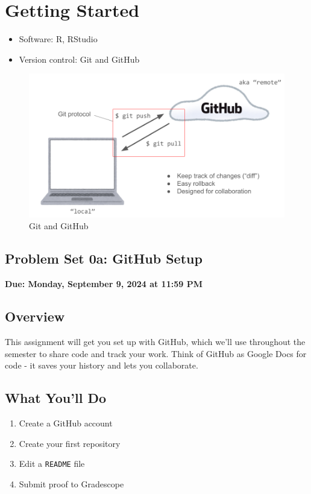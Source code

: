 \documentclass[
  11pt,
  letterpaper]{article}
\providecommand{\tightlist}{%
  \setlength{\itemsep}{0pt}\setlength{\parskip}{0pt}}
\begin{document}
\section{Getting Started}\label{getting-started}

\begin{itemize}
\item
  Software: R, RStudio
\item
  Version control: Git and GitHub
\end{itemize}

\begin{figure}
\centering
\includegraphics[width=0.75\linewidth,height=\textheight,keepaspectratio]{assets/gitvsgithub.png}
\caption{Git and GitHub}
\end{figure}

\newpage

\begin{center}
  \section{Problem Set 0a: GitHub Setup}
  \textbf{Due: Monday, September 9, 2024 at 11:59 PM}
\end{center}

\subsection{Overview}\label{overview}

This assignment will get you set up with GitHub, which we'll use
throughout the semester to share code and track your work. Think of
GitHub as Google Docs for code - it saves your history and lets you
collaborate.

\subsection{What You'll Do}\label{what-youll-do}

\begin{enumerate}
\def\labelenumi{\arabic{enumi}.}
\tightlist
\item
  Create a GitHub account
\item
  Create your first repository
\item
  Edit a \texttt{README} file
\item
  Submit proof to Gradescope
\end{enumerate}
\end{document}
